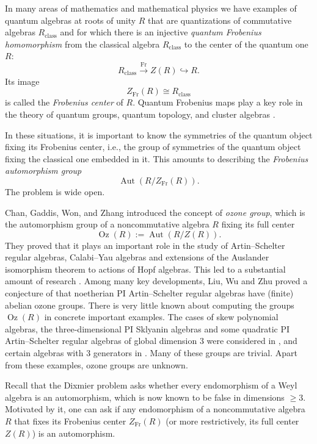 \documentclass[11pt]{amsart}
\theoremstyle{plain}
\DeclareMathOperator \Aut { {\mathrm{Aut}} }
\DeclareMathOperator \Oz { {\mathrm{Oz}}}
\DeclareMathOperator \Fr { {\mathrm{Fr}}}
\begin{document}
In many areas of mathematics and mathematical physics we have examples of quantum algebras at roots of unity $R$ that are quantizations of commutative algebras $R_{\mathrm{class}}$ and for which there is an injective {\em{quantum Frobenius homomorphism}} from the classical algebra $R_{\mathrm{class}}$ to the center of the quantum one $R$:
\[
R_{\mathrm{class}} \stackrel{\Fr}{\longrightarrow} Z(R) \hookrightarrow R.
\]
Its image 
\[
Z_{\Fr}(R) \cong R_{\mathrm{class}}
\]
is called the {\em{Frobenius center}} of $R$. Quantum Frobenius maps play a key role in the theory of quantum groups, quantum topology, and cluster algebras \cite{BW,DK,DKP,DKP95,DCL94,FG,FKL,GJS,KL,Lus2,NTY2}.

In these situations, it is important to know the symmetries of the quantum object fixing its Frobenius center, i.e., the group of symmetries of the quantum object fixing the classical one embedded in it. This amounts to describing the {\em{Frobenius automorphism group}}
\[
\Aut(R/Z_{\Fr}(R)).
\]
The problem is wide open.

Chan, Gaddis, Won, and Zhang \cite{CGWZ,CGWZ2} introduced the concept of {\em{ozone group}}, which is the automorphism group of a noncommutative algebra $R$ fixing its full center 
\[
\Oz(R):= \Aut(R/Z(R)).
\]
They proved that it plays an important role in the study of Artin--Schelter regular algebras, Calabi--Yau algebras and extensions of the Auslander isomorphism theorem to actions of Hopf algebras. This led to a substantial amount of research \cite{GY,LWZ,Z}. Among many key developments, Liu, Wu and Zhu \cite{LWZ} proved a conjecture of \cite{CGWZ2} that noetherian PI Artin--Schelter regular algebras have (finite) abelian ozone groups. 
There is very little known about computing the groups $\Oz(R)$ in concrete important examples. The cases of skew polynomial algebras, the three-dimensional PI Sklyanin algebras and some quadratic PI Artin--Schelter
regular algebras of global dimension 3 were considered in \cite{CGWZ,CGWZ2}, and certain algebras with 3 generators in \cite{GY}. Many of these groups are trivial. Apart from these examples, ozone groups are unknown. 

Recall that the Dixmier problem asks whether every endomorphism of a Weyl algebra is an automorphism, which is now known to be false in dimensions $\geq 3$. Motivated by it, one can ask if any endomorphism of a noncommutative algebra $R$ that fixes its Frobenius center $Z_{\Fr}(R)$ (or more restrictively, its full center $Z(R)$) is an automorphism. 
\end{document}
